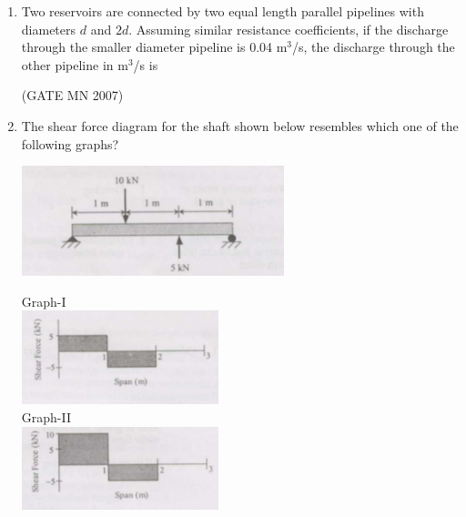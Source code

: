 \documentclass[journal]{IEEEtran}
\begin{document}
\begin{enumerate}
\item Two reservoirs are connected by two equal length parallel pipelines with diameters $d$ and $2d$. Assuming similar resistance coefficients, if the discharge through the smaller diameter pipeline is 0.04 m$^3$/s, the discharge through the other pipeline in m$^3$/s is  
\begin{enumerate}
\end{enumerate}

\hfill (GATE MN 2007)

\item The shear force diagram for the shaft shown below resembles which one of the following graphs?  

\begin{center}
\includegraphics[width=0.6\textwidth]{Screenshot_2025_0812_143315.png}
\end{center}

\begin{multicols}{2}
	Graph-I \\
\includegraphics[width=0.45\textwidth]{Screenshot_2025_0812_143545.png} \\
Graph-II \\
\includegraphics[width=0.45\textwidth]{Screenshot_2025_0812_143610.png} \\


\end{multicols}
\end{enumerate}
\end{document}
